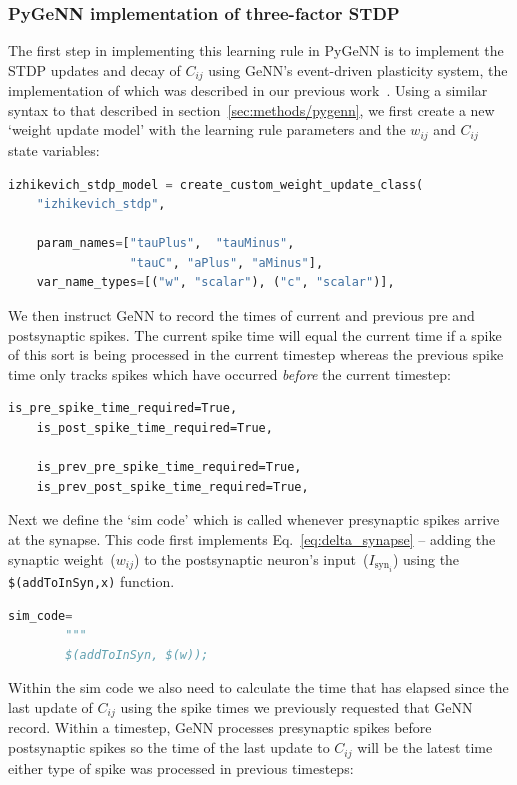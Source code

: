 \documentclass[utf8]{frontiersSCNS} %
\begin{document}
\subsubsection{PyGeNN implementation of three-factor STDP}
The first step in implementing this learning rule in PyGeNN is to implement the STDP updates and decay of $C_{ij}$ using GeNN's event-driven plasticity system, the implementation of which was described in our previous work~\citep{Knight2018}.
Using a similar syntax to that described in section~\ref{sec:methods/pygenn}, we first create a new `weight update model' with the learning rule parameters and the $w_{ij}$ and $C_{ij}$ state variables:
%
\begin{lstlisting}[language=python]
izhikevich_stdp_model = create_custom_weight_update_class(
    "izhikevich_stdp",
    
    param_names=["tauPlus",  "tauMinus", 
                 "tauC", "aPlus", "aMinus"],
    var_name_types=[("w", "scalar"), ("c", "scalar")],
\end{lstlisting}
%
We then instruct GeNN to record the times of current and previous pre and postsynaptic spikes.
The current spike time will equal the current time if a spike of this sort is being processed in the current timestep whereas the previous spike time only tracks spikes which have occurred \emph{before} the current timestep:
%
\begin{lstlisting}[morekeywords={True}]
    is_pre_spike_time_required=True,
    is_post_spike_time_required=True,
    
    is_prev_pre_spike_time_required=True,
    is_prev_post_spike_time_required=True,
\end{lstlisting}
%
Next we define the `sim code' which is called whenever presynaptic spikes arrive at the synapse.
This code first implements Eq.~\ref{eq:delta_synapse} -- adding the synaptic weight~($w_{ij}$) to the postsynaptic neuron's input~($I_{\text{syn}_{i}}$) using the \lstinline{$(addToInSyn,x)} function.
%
\begin{lstlisting}[language=python]
    sim_code=
        """
        $(addToInSyn, $(w));
\end{lstlisting}
%
Within the sim code we also need to calculate the time that has elapsed since the last update of $C_{ij}$ using the spike times we previously requested that GeNN record.
Within a timestep, GeNN processes presynaptic spikes before postsynaptic spikes so the time of the last update to $C_{ij}$ will be the latest time either type of spike was processed in previous timesteps:
\end{document}
